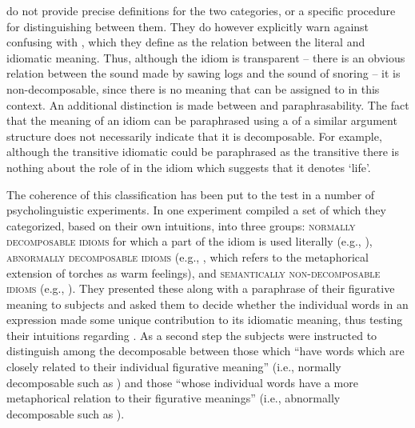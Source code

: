 \documentclass[output=paper]{langsci/langscibook}
\begin{document}
\citet{nunberg94} do not provide precise definitions for the two categories,
or a specific procedure for distinguishing between them. They do however explicitly warn against confusing  with , which they define as the relation between the literal and idiomatic meaning. Thus, although the idiom  is transparent -- there is an obvious relation between the sound made by sawing logs and the sound of snoring -- it is non-decomposable, since there is no meaning that can be assigned to  in this context. An additional distinction is made between  and paraphrasability. The fact that the meaning of an idiom can be paraphrased using a  of a similar argument structure does not necessarily indicate that it is decomposable. For example, although the transitive idiomatic   could be paraphrased as the transitive   there is nothing about the role of  in the idiom which suggests that it denotes `life'.


The coherence of this classification has been put to the
test in a number of psycholinguistic experiments.
In one experiment \citet{gibbs89} compiled a set of  which they categorized, based on their own intuitions, into three groups: {\scshape normally decomposable idioms} for which a part of the idiom is used literally (e.g., ),  {\scshape abnormally decomposable idioms}  (e.g., , which refers to the metaphorical extension of torches as warm feelings), and {\scshape semantically non-de\-com\-pos\-able idioms} (e.g., ). They presented these  along with a paraphrase of their figurative meaning to subjects and asked them to decide whether the individual words in an expression made some unique contribution to its idiomatic meaning, thus testing their intuitions regarding . As a second step the subjects were instructed to distinguish among the decomposable  between those which ``have words which are closely related to their individual figurative meaning'' (i.e., normally decomposable  such as ) and those ``whose individual words have a more metaphorical relation to their figurative meanings'' (i.e., abnormally decomposable  such as ).
\end{document}

